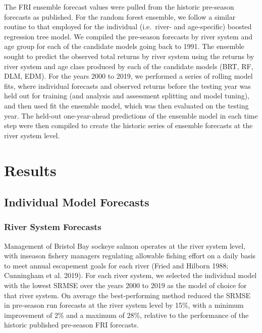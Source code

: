 \documentclass[
]{article}
\begin{document}
The FRI ensemble forecast values were pulled from the historic pre-season forecasts as published. For the random forest ensemble, we follow a similar routine to that employed for the individual (i.e.~river- and age-specific) boosted regression tree model. We compiled the pre-season forecasts by river system and age group for each of the candidate models going back to 1991. The ensemble sought to predict the observed total returns by river system using the returns by river system and age class produced by each of the candidate models (BRT, RF, DLM, EDM). For the years 2000 to 2019, we performed a series of rolling model fits, where individual forecasts and observed returns before the testing year was held out for training (and analysis and assessment splitting and model tuning), and then used fit the ensemble model, which was then evaluated on the testing year. The held-out one-year-ahead predictions of the ensemble model in each time step were then compiled to create the historic series of ensemble forecasts at the river system level.

\hypertarget{results}{%
\section{Results}\label{results}}

\hypertarget{individual-model-forecasts}{%
\subsection{Individual Model Forecasts}\label{individual-model-forecasts}}

\hypertarget{river-system-forecasts}{%
\subsubsection{River System Forecasts}\label{river-system-forecasts}}

Management of Bristol Bay sockeye salmon operates at the river system level, with inseason fishery managers regulating allowable fishing effort on a daily basis to meet annual escapement goals for each river (Fried and Hilborn 1988; Cunningham et al. 2019). For each river system, we selected the individual model with the lowest SRMSE over the years 2000 to 2019 as the model of choice for that river system. On average the best-performing method reduced the SRMSE in pre-season run forecasts at the river system level by 15\%, with a minimum improvement of 2\% and a maximum of 28\%, relative to the performance of the historic published pre-season FRI forecasts.
\end{document}
